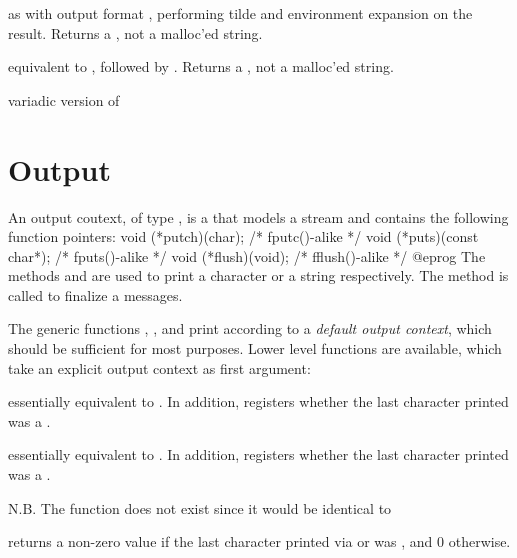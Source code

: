  as  with output format ,
performing tilde and environment expansion on the result. Returns a
, not a malloc'ed string.

 equivalent to
, followed by . Returns a ,
not a malloc'ed string.

 variadic version of

\section{Output}


An output coutext, of type , is a 
that models a stream and contains the following function pointers:
\bprog
void (*putch)(char);           /* fputc()-alike */
void (*puts)(const char*);     /* fputs()-alike */
void (*flush)(void);           /* fflush()-alike */
@eprog\noindent
The methods  and  are used to print a character
or a string respectively.  The method  is called to finalize a
messages.

The generic functions , ,  and
 print according to a \emph{default output context}, which
should be sufficient for most purposes. Lower level functions are available,
which take an explicit output context as first argument:

 essentially equivalent to
. In addition, registers whether the last character printed
was a .

 essentially equivalent to
. In addition, registers whether the last character printed
was a .



\noindent N.B. The function  does not exist since it would be
identical to 

 returns a non-zero value if the last
character printed via  or  was , and $0$ otherwise.

